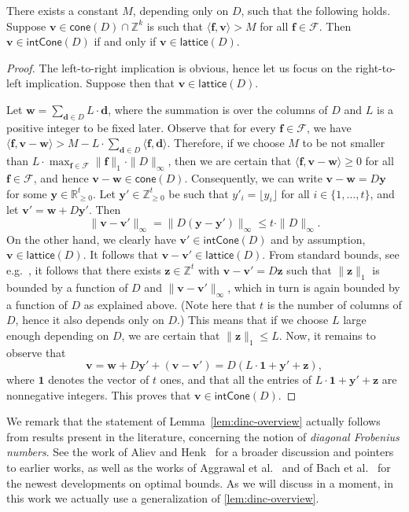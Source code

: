 \documentclass{article}
\renewcommand{\leq}{\leqslant}
\renewcommand{\geq}{\geqslant}
\newcommand{\Z}{\mathbb{Z}}
\newcommand{\Zn}{\Z_{\geq 0}}
\newcommand{\R}{\mathbb{R}}
\newcommand{\myRn}{\R_{\geq 0}} %
\newcommand{\tup}[1]{{\mathbf{#1}}}
\newcommand{\ww}{\tup w}
\newcommand{\yy}{\tup y}
\newcommand{\zz}{\tup z}
\newcommand{\ff}{\tup f}
\newcommand{\dd}{\tup d}
\newcommand{\myvv}{\tup v} %
\newcommand{\Ff}{\mathcal{F}}
\newcommand{\sca}[2]{\langle #1,#2\rangle}
\newcommand{\realcone}{\mathsf{cone}}
\newcommand{\intcone}{\mathsf{intCone}}
\newcommand{\lattice}{\mathsf{lattice}}
\begin{document}
\begin{lemma}\label{lem:dinc-overview}
 There exists a constant $M$, depending only on $D$, such that the following holds.
 Suppose $\myvv\in \realcone(D)\cap \Z^k$ is such that $\sca{\ff}{\myvv}>M$ for all $\ff\in \Ff$. Then $\myvv\in \intcone(D)$ if and only if $\myvv\in \lattice(D)$.
\end{lemma}
\begin{proof}
 The left-to-right implication is obvious, hence let us focus on the right-to-left implication. Suppose then that $\myvv\in \lattice(D)$.

 Let $\ww=\sum_{\dd\in D} L\cdot \dd$, where the summation is over the columns of $D$ and $L$ is a positive integer to be fixed later. Observe that for every $\ff\in \Ff$, we have $\sca{\ff}{\myvv-\ww}> M-L\cdot \sum_{\dd\in D}\sca{\ff}{\dd}$. Therefore, if we choose $M$ to be not smaller than $L\cdot \max_{\ff\in \Ff}\|\ff\|_1\cdot \|D\|_\infty$, then we are certain that $\sca{\ff}{\myvv-\ww}\geq 0$ for all $\ff\in \Ff$, and hence $\myvv-\ww\in \realcone(D)$. Consequently, we can write $\myvv-\ww=D\yy$ for some $\yy\in \myRn^t$. Let $\yy'\in \Zn^t$ be such that $y'_i=\lfloor y_i\rfloor$ for all $i\in \{1,\ldots,t\}$, and let $\myvv'=\ww+D\yy'$. Then
 $$\|\myvv-\myvv'\|_\infty = \|D(\yy-\yy')\|_\infty\leq t\cdot \|D\|_\infty.$$
 On the other hand, we clearly have $\myvv'\in \intcone(D)$ and by assumption, $\myvv\in \lattice(D)$. It follows that $\myvv-\myvv'\in \lattice(D)$. From standard bounds, see e.g.~\cite{Pottier91}, it follows that there exists $\zz\in \Z^t$ with $\myvv-\myvv'=D\zz$ such that $\|\zz\|_1$ is bounded by a function of $D$ and $\|\myvv-\myvv'\|_\infty$, which in turn is again bounded by a function of $D$ as explained above. (Note here that $t$ is the number of columns of $D$, hence it also depends only on $D$.) This means that if we choose $L$ large enough depending on $D$, we are certain that $\|\zz\|_1\leq L$. Now, it remains to observe that
 $$\myvv=\ww+D\yy'+(\myvv-\myvv')=D(L\cdot \boldsymbol{1}+\yy'+\zz),$$
 where $\boldsymbol{1}$ denotes the vector of $t$ ones, and that all the entries of $L\cdot \boldsymbol{1}+\yy'+\zz$ are nonnegative integers. This proves that $\myvv\in \intcone(D)$.
\end{proof}

We remark that the statement of Lemma~\ref{lem:dinc-overview} actually follows from results present in the literature, concerning the notion of {\em{diagonal Frobenius numbers}}. See the work of Aliev and Henk~\cite{AlievH10} for a broader discussion and pointers to earlier works, as well as the works of Aggrawal et al.~\cite{AggrawalJSW24} and of Bach et al.~\cite{BachERW24} for the newest developments on optimal bounds. As we will discuss in a moment, in this work we actually use a generalization of \cref{lem:dinc-overview}.
\end{document}
